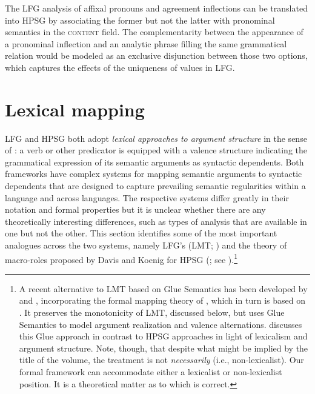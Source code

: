 The LFG analysis of  affixal pronouns and agreement inflections can be translated into HPSG by associating the former but not the latter with pronominal semantics in the \textsc{content} field.  
The complementarity between the appearance of a pronominal inflection and an analytic phrase filling the same grammatical relation would be modeled as an exclusive disjunction between those two options, which captures the effects of the uniqueness of  values in LFG.  
                  
                  
\section{Lexical mapping}
LFG and HPSG both adopt \textit{lexical approaches to argument structure} in the sense of \citet{MWArgSt}: a verb or other predicator is equipped with a valence structure indicating the grammatical expression of its semantic arguments as syntactic dependents.  Both frameworks have complex systems for mapping semantic arguments to syntactic dependents that are designed to capture prevailing semantic regularities within a language and across languages.   The respective systems differ greatly in their notation and formal properties but it is unclear whether 
there are any theoretically interesting differences, such as types of analysis that are available in one but not the other.  This section identifies some of the most important  analogues across the two systems, namely LFG's  (LMT; \cite[Chapter 14]{BATW2016a}) and the theory of macro-roles proposed by Davis and Koenig for HPSG (\citealt{Davis96a-u,DK2000b-u}; see ).\footnote{A recent alternative to LMT based on Glue Semantics has been developed by \citet{asudeh;giorgolo-lfg12} and \citet{asudeh;ea14-lfg}, incorporating the formal mapping theory of \citet{findlay16}, which in turn is based on \citet{kibort07}. It preserves the monotonicity of LMT, discussed below, but uses Glue Semantics to model argument realization and valence alternations. \citet{MuellerLFGphrasal} discusses this Glue approach in contrast to HPSG approaches in light of lexicalism and argument structure. Note, though, that despite what might be implied by the title of the \citeauthor{MuellerLFGphrasal} volume, the \citeauthor{asudeh;ea14-lfg} treatment is not \emph{necessarily}  (i.e., non-lexicalist). Our formal framework can accommodate either a lexicalist or non-lexicalist position. It is a theoretical matter as to which is correct.}
 
